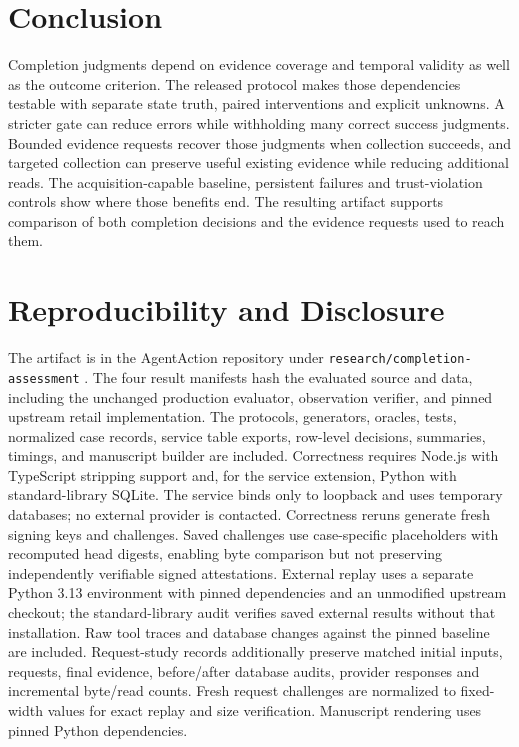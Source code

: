 \documentclass[11pt]{article}
\begin{document}
\section{Conclusion}
Completion judgments depend on evidence coverage and temporal validity as well as the outcome criterion. The released protocol makes those dependencies testable with separate state truth, paired interventions and explicit unknowns. A stricter gate can reduce errors while withholding many correct success judgments. Bounded evidence requests recover those judgments when collection succeeds, and targeted collection can preserve useful existing evidence while reducing additional reads. The acquisition-capable baseline, persistent failures and trust-violation controls show where those benefits end. The resulting artifact supports comparison of both completion decisions and the evidence requests used to reach them.

\section*{Reproducibility and Disclosure}
The artifact is in the AgentAction repository under \texttt{research/completion-assessment} \cite{artifact}. The four result manifests hash the evaluated source and data, including the unchanged production evaluator, observation verifier, and pinned upstream retail implementation. The protocols, generators, oracles, tests, normalized case records, service table exports, row-level decisions, summaries, timings, and manuscript builder are included. Correctness requires Node.js with TypeScript stripping support and, for the service extension, Python with standard-library SQLite. The service binds only to loopback and uses temporary databases; no external provider is contacted. Correctness reruns generate fresh signing keys and challenges. Saved challenges use case-specific placeholders with recomputed head digests, enabling byte comparison but not preserving independently verifiable signed attestations. External replay uses a separate Python 3.13 environment with pinned dependencies and an unmodified upstream checkout; the standard-library audit verifies saved external results without that installation. Raw tool traces and database changes against the pinned baseline are included. Request-study records additionally preserve matched initial inputs, requests, final evidence, before/after database audits, provider responses and incremental byte/read counts. Fresh request challenges are normalized to fixed-width values for exact replay and size verification. Manuscript rendering uses pinned Python dependencies.
\end{document}
